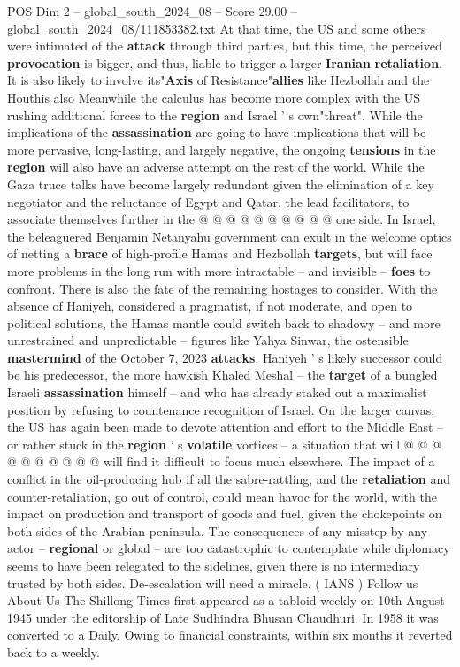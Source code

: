 \begin{textsample}{POS Dim 2 – global\_south\_2024\_08 – Score 29.00 – global\_south\_2024\_08/111853382.txt}
At that time, the US and some others were intimated of the \textbf{attack} through third parties, but this time, the perceived \textbf{provocation} is bigger, and thus, liable to trigger a larger \textbf{Iranian} \textbf{retaliation}.
It is also likely to involve its"\textbf{Axis} of Resistance"\textbf{allies} like Hezbollah and the Houthis also Meanwhile the calculus has become more complex with the US rushing additional forces to the \textbf{region} and Israel ' s own"threat".
While the implications of the \textbf{assassination} are going to have implications that will be more pervasive, long-lasting, and largely negative, the ongoing \textbf{tensions} in the \textbf{region} will also have an adverse attempt on the rest of the world.
While the Gaza truce talks have become largely redundant given the elimination of a key negotiator and the reluctance of Egypt and Qatar, the lead facilitators, to associate themselves further in the @ @ @ @ @ @ @ @ @ @ one side.
In Israel, the beleaguered Benjamin Netanyahu government can exult in the welcome optics of netting a \textbf{brace} of high-profile Hamas and Hezbollah \textbf{targets}, but will face more problems in the long run with more intractable -- and invisible -- \textbf{foes} to confront.
There is also the fate of the remaining hostages to consider.
With the absence of Haniyeh, considered a pragmatist, if not moderate, and open to political solutions, the Hamas mantle could switch back to shadowy -- and more unrestrained and unpredictable -- figures like Yahya Sinwar, the ostensible \textbf{mastermind} of the October 7, 2023 \textbf{attacks}.
Haniyeh ' s likely successor could be his predecessor, the more hawkish Khaled Meshal -- the \textbf{target} of a bungled Israeli \textbf{assassination} himself -- and who has already staked out a maximalist position by refusing to countenance recognition of Israel.
On the larger canvas, the US has again been made to devote attention and effort to the Middle East -- or rather stuck in the \textbf{region} ' s \textbf{volatile} vortices -- a situation that will @ @ @ @ @ @ @ @ @ @ will find it difficult to focus much elsewhere.
The impact of a conflict in the oil-producing hub if all the sabre-rattling, and the \textbf{retaliation} and counter-retaliation, go out of control, could mean havoc for the world, with the impact on production and transport of goods and fuel, given the chokepoints on both sides of the Arabian peninsula.
The consequences of any misstep by any actor -- \textbf{regional} or global -- are too catastrophic to contemplate while diplomacy seems to have been relegated to the sidelines, given there is no intermediary trusted by both sides.
De-escalation will need a miracle. ( IANS ) Follow us About Us The Shillong Times first appeared as a tabloid weekly on 10th August 1945 under the editorship of Late Sudhindra Bhusan Chaudhuri.
In 1958 it was converted to a Daily.
Owing to financial constraints, within six months it reverted back to a weekly.


\end{textsample}
